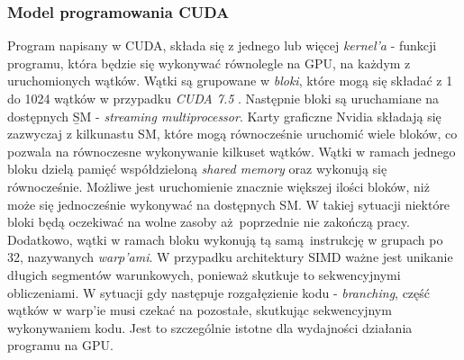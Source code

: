 \subsubsection{Model programowania CUDA}
Program napisany w CUDA, składa się z jednego lub więcej \textit{kernel'a} - funkcji programu,
która będzie się wykonywać równolegle na GPU, na każdym z uruchomionych wątków.
Wątki są grupowane w \textit{bloki}, które mogą się składać z 1 do 1024 wątków w przypadku \textit{CUDA 7.5} \cite{CudaDeveloper}.
Następnie bloki są uruchamiane na dostępnych \b{SM} - \textit{streaming multiprocessor}.
Karty graficzne Nvidia składają się zazwyczaj z kilkunastu SM, które mogą równocześnie uruchomić wiele
bloków, co pozwala na równoczesne wykonywanie kilkuset wątków.
Wątki w ramach jednego bloku dzielą pamięć współdzieloną \textit{shared memory} oraz wykonują się równocześnie.
Możliwe jest uruchomienie znacznie większej ilości bloków, niż może się jednocześnie wykonywać na dostępnych SM.
W takiej sytuacji niektóre bloki będą oczekiwać na wolne zasoby aż poprzednie nie zakończą pracy.
Dodatkowo, wątki w ramach bloku wykonują tą samą instrukcję w grupach po 32,
nazywanych \textit{warp'ami}.
W przypadku architektury SIMD ważne jest unikanie długich segmentów
warunkowych, ponieważ skutkuje to sekwencyjnymi obliczeniami.
W sytuacji gdy następuje rozgałęzienie kodu - \textit{branching},
część wątków w warp'ie musi czekać na pozostałe, skutkując sekwencyjnym wykonywaniem kodu.
Jest to szczególnie istotne dla wydajności działania programu na GPU.
